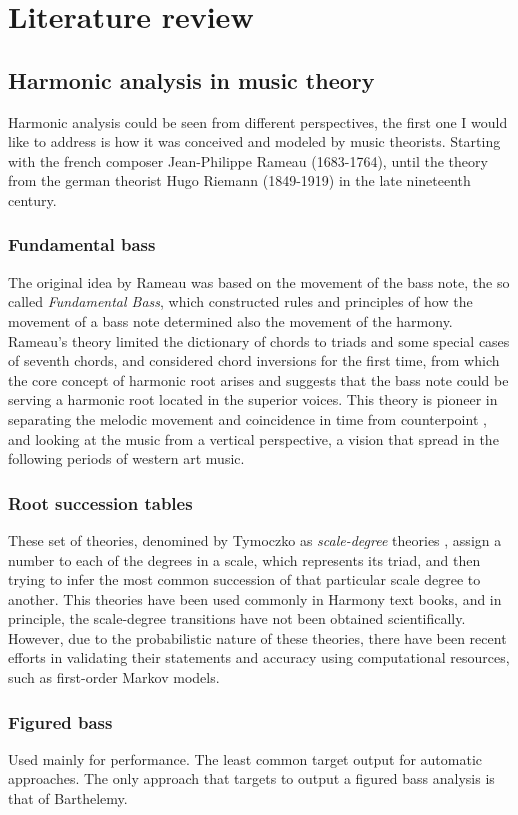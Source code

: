 \chapter{Literature review}
\section{Harmonic analysis in music theory}
Harmonic analysis could be seen from different perspectives, the first one I would like to address is how it was conceived and modeled by music theorists. Starting with the french composer Jean-Philippe Rameau (1683-1764), until the theory from the german theorist Hugo Riemann (1849-1919) in the late nineteenth century.
  \subsection{Fundamental bass}
  The original idea by Rameau was based on the movement of the bass note, the so called \emph{Fundamental Bass}, which constructed rules and principles of how the movement of a bass note determined also the movement of the harmony. Rameau's theory limited the dictionary of chords to triads and some special cases of seventh chords, and considered chord inversions for the first time, from which the core concept of harmonic root arises and suggests that the bass note could be serving a harmonic root located in the superior voices. This theory is pioneer in separating the melodic movement and coincidence in time from counterpoint \cite{beach1974origins}, and looking at the music from a vertical perspective, a vision that spread in the following periods of western art music.
  \subsection{Root succession tables}
  These set of theories, denomined by Tymoczko as \emph{scale-degree} theories \cite{tymoczko2001root}, assign a number to each of the degrees in a scale, which represents its triad, and then trying to infer the most common succession of that particular scale degree to another. This theories have been used commonly in Harmony text books, and in principle, the scale-degree transitions have not been obtained scientifically. However, due to the probabilistic nature of these theories, there have been recent efforts in validating their statements and accuracy using computational resources, such as first-order Markov models.
  \subsection{Figured bass}
  Used mainly for performance. The least common target output for automatic approaches. The only approach that targets to output a figured bass analysis is that of Barthelemy.
